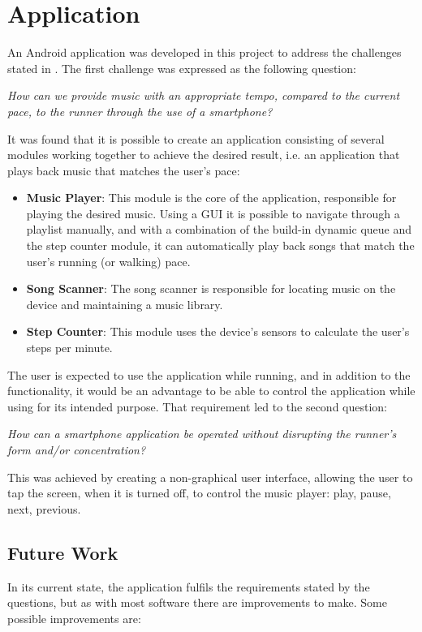 \section{Application}
An Android application was developed in this project to address the challenges stated in . The first challenge was expressed as the following question:

\begin{center}
\textit{How can we provide music with an appropriate tempo, compared to the current pace, to the runner through the use of a smartphone?}
\end{center}

It was found that it is possible to create an application consisting of several modules working together to achieve the desired result, i.e. an application that plays back music that matches the user's pace:

\begin{itemize}
\item \textbf{Music Player}: This module is the core of the application, responsible for playing the desired music. Using a GUI it is possible to navigate through a playlist manually, and with a combination of the build-in dynamic queue and the step counter module, it can automatically play back songs that match the user's running (or walking) pace.
\item \textbf{Song Scanner}: The song scanner is responsible for locating music on the device and maintaining a music library.
\item \textbf{Step Counter}: This module uses the device's sensors to calculate the user's steps per minute.
\end{itemize}

The user is expected to use the application while running, and in addition to the functionality, it would be an advantage to be able to control the application while using for its intended purpose. That requirement led to the second question:

\begin{center}
\textit{How can a smartphone application be operated without disrupting the runner's form and/or concentration?}
\end{center}

This was achieved by creating a non-graphical user interface, allowing the user to tap the screen, when it is turned off, to control the music player: play, pause, next, previous.


\subsection{Future Work}
In its current state, the application fulfils the requirements stated by the questions, but as with most software there are improvements to make. Some possible improvements are:

